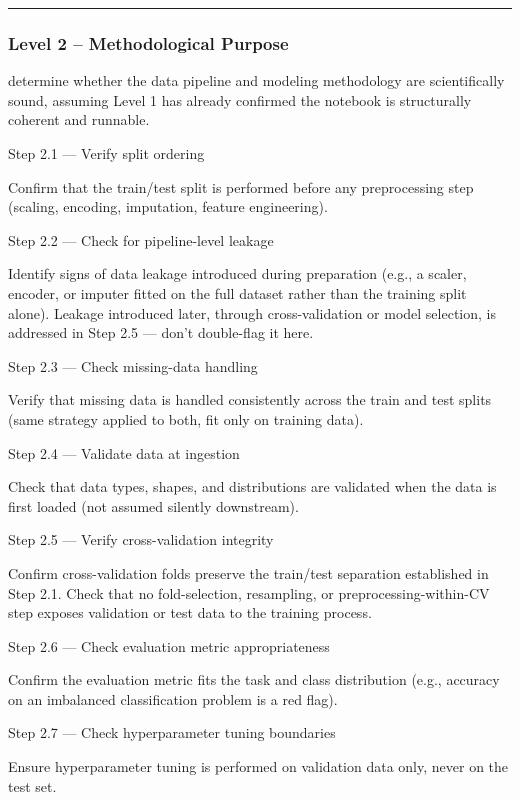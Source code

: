 \documentclass[11pt, a4paper]{article}
\begin{document}
\rule{\textwidth}{0.3pt}

\vspace{.3cm}

\subsubsection*{Level 2 -- Methodological Purpose} 
determine whether the data pipeline and modeling methodology are scientifically sound, assuming Level 1 has already confirmed the notebook is structurally coherent and runnable.

Step 2.1 — Verify split ordering

Confirm that the train/test split is performed before any preprocessing step (scaling, encoding, imputation, feature engineering).

Step 2.2 — Check for pipeline-level leakage

Identify signs of data leakage introduced during preparation (e.g., a scaler, encoder, or imputer fitted on the full dataset rather than the training split alone).
Leakage introduced later, through cross-validation or model selection, is addressed in Step 2.5 — don't double-flag it here.

Step 2.3 — Check missing-data handling

Verify that missing data is handled consistently across the train and test splits (same strategy applied to both, fit only on training data).

Step 2.4 — Validate data at ingestion

Check that data types, shapes, and distributions are validated when the data is first loaded (not assumed silently downstream).

Step 2.5 — Verify cross-validation integrity

Confirm cross-validation folds preserve the train/test separation established in Step 2.1.
Check that no fold-selection, resampling, or preprocessing-within-CV step exposes validation or test data to the training process.

Step 2.6 — Check evaluation metric appropriateness

Confirm the evaluation metric fits the task and class distribution (e.g., accuracy on an imbalanced classification problem is a red flag).

Step 2.7 — Check hyperparameter tuning boundaries

Ensure hyperparameter tuning is performed on validation data only, never on the test set.
\end{document}
